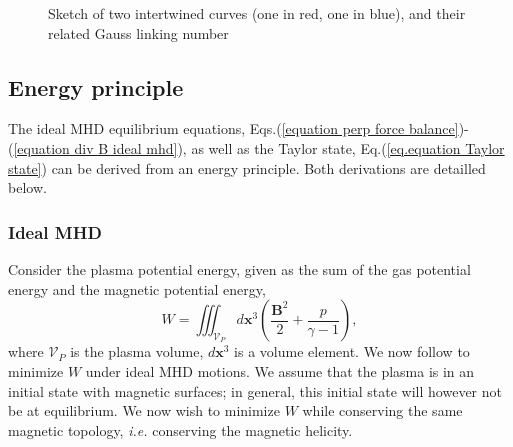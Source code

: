 \documentclass[my_thesis.tex]{subfiles}
\begin{document}
\begin{figure}
	\hspace{.125\linewidth}
	\hfill
	\hspace{.125\linewidth}
	\caption{Sketch of two intertwined curves (one in red, one in blue), and their related Gauss linking number}
	\label{fig gauss linking number}
\end{figure}



\subsection{Energy principle}
The ideal MHD equilibrium equations, Eqs.(\ref{equation perp force balance})-(\ref{equation div B ideal mhd}), as well as the Taylor state, Eq.(\ref{eq.equation Taylor state}) can be derived from an energy principle. Both derivations are detailled below.

\subsubsection{Ideal MHD} \label{energy principle ideal mhd}
Consider the plasma potential energy, given as the sum of the gas potential energy and the magnetic potential energy, 
\begin{equation}
	W = \iiint_{\mathcal{V}_P} d\mathbf{x}^3 \left(\frac{\mathbf{B}^2}{2} + \frac{p}{\gamma-1}\right), \label{eq. energy functional}
\end{equation}
where $\mathcal{V}_P$ is the plasma volume, $d\mathbf{x}^3$ is a volume element. We now follow \citet{kruskalEquilibriumMagneticallyConfined1958} to minimize $W$ under ideal MHD motions. We assume that the plasma is in an initial state with magnetic surfaces; in general, this initial state will however not be at equilibrium. We now wish to minimize $W$ while conserving the same magnetic topology, \textit{i.e.} conserving the magnetic helicity.
\end{document}
